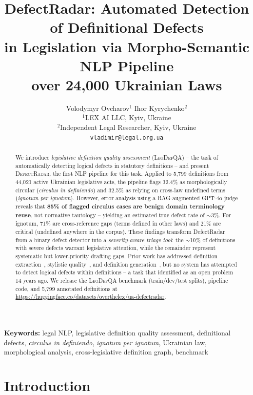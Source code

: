 \documentclass[11pt]{article}
\title{DefectRadar: Automated Detection of Definitional Defects\\in Legislation via Morpho-Semantic NLP Pipeline\\over 24{,}000 Ukrainian Laws}
\author{
  Volodymyr Ovcharov$^{1}$ \quad Ihor Kyrychenko$^{2}$ \\[6pt]
  $^{1}$LEX AI LLC, Kyiv, Ukraine \\
  $^{2}$Independent Legal Researcher, Kyiv, Ukraine \\[4pt]
  \texttt{vladimir@legal.org.ua}
}
\date{}
\begin{document}
\renewcommand{\abstractname}{Abstract}
\maketitle

\begin{abstract}
We introduce \emph{legislative definition quality assessment} (\textsc{LegDefQA}) -- the task of automatically detecting logical defects in statutory definitions -- and present \textsc{DefectRadar}, the first NLP pipeline for this task.
Applied to 5{,}799 definitions from 44{,}021 active Ukrainian legislative acts, the pipeline flags 32.4\% as morphologically circular (\emph{circulus in definiendo}) and 32.5\% as relying on cross-law undefined terms (\emph{ignotum per ignotum}).
However, error analysis using a RAG-augmented GPT-4o judge reveals that \textbf{85\% of flagged circulus cases are benign domain terminology reuse}, not normative tautology -- yielding an estimated true defect rate of $\sim$3\%.
For ignotum, 71\% are cross-reference gaps (terms defined in other laws) and 21\% are critical (undefined anywhere in the corpus).
These findings transform DefectRadar from a binary defect detector into a \emph{severity-aware triage tool}: the $\sim$10\% of definitions with severe defects warrant legislative attention, while the remainder represent systematic but lower-priority drafting gaps.
Prior work has addressed definition extraction~\citep{hosabettu2025statutory}, stylistic quality~\citep{hofler2012style}, and definition generation~\citep{chouhan2024lexdrafter}, but no system has attempted to detect logical defects within definitions -- a task that \citet{hofler2012style} identified as an open problem 14 years ago.
We release the \textsc{LegDefQA} benchmark (train/dev/test splits), pipeline code, and 5{,}799 annotated definitions at \url{https://huggingface.co/datasets/overthelex/ua-defectradar}.
\end{abstract}

\noindent\textbf{Keywords:} legal NLP, legislative definition quality assessment, definitional defects, \emph{circulus in definiendo}, \emph{ignotum per ignotum}, Ukrainian law, morphological analysis, cross-legislative definition graph, benchmark

\section{Introduction}
\label{sec:intro}
\end{document}
